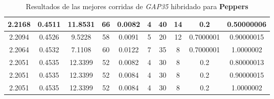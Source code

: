 \begin{table}[h!]
\begin{center}
\begin{tabular}{|c|c|c|c|c|c|c|c|c|c|}
            2.2168 & 0.4511  & 11.8531 & 66 & 0.0082 & 4 & 40 & 14 & 0.2 & 0.50000006\\
        \hline
        \hline
            2.2094 & 0.4526  & 9.5228 & 58 & 0.0091 & 5 & 20 & 12 & 0.7000001 & 0.90000015\\
        \hline
        \hline
            2.2064 & 0.4532  & 7.1108 & 60 & 0.0122 & 7 & 35 & 8 & 0.7000001 & 1.0000002\\
        \hline
        \hline
            2.2051 & 0.4535  & 12.3399 & 52 & 0.0082 & 4 & 30 & 8 & 0.2 & 0.80000013\\
        \hline
        \hline
            2.2051 & 0.4535  & 12.3399 & 52 & 0.0084 & 4 & 30 & 8 & 0.2 & 0.90000015\\
        \hline
        \hline
            2.2051 & 0.4535  & 12.3399 & 52 & 0.0084 & 4 & 30 & 8 & 0.2 & 1.0000002\\
        \hline
        \end{tabular}
        \caption{Resultados de las mejores corridas de \emph{GAP35} hibridado para {\bf Peppers}}
        \label{tb:tableGAP35}
    \end{center}
\end{table}
